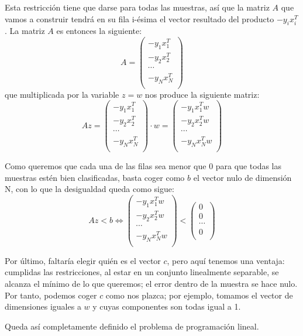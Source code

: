 \documentclass[a4paper, 11pt]{article}
\begin{document}
\begin{solucion}
        Esta restricción tiene que darse para todas las muestras, así que la matriz $A$ que vamos a construir tendrá en su fila i-ésima el vector resultado del producto $-y_i x_i^T$. La matriz $A$ es entonces la siguiente:
        \[
        A = \begin{pmatrix}
            -y_1 x_1^T \\
            -y_2 x_2^T \\
            \cdots \\
            -y_N x_N^T \\
        \end{pmatrix}
        \]
        que multiplicada por la variable $z = w$ nos produce la siguiente matriz:
        \[
        Az = \begin{pmatrix}
            -y_1 x_1^T \\
            -y_2 x_2^T \\
            \cdots \\
            -y_N x_N^T \\
        \end{pmatrix}\cdot w = \begin{pmatrix}
            -y_1 x_1^T w \\
            -y_2 x_2^T w \\
            \cdots \\
            -y_N x_N^T w \\
        \end{pmatrix}
        \]

        Como queremos que cada una de las filas sea menor que 0 para que todas las muestras estén bien clasificadas, basta coger como $b$ el vector nulo de dimensión N, con lo que la desigualdad queda como sigue:
        \[
        Az < b \iff \begin{pmatrix}
            -y_1 x_1^T w \\
            -y_2 x_2^T w \\
            \cdots \\
            -y_N x_N^T w \\
        \end{pmatrix} < \begin{pmatrix}
            0 \\
            0 \\
            \cdots \\
            0 \\
        \end{pmatrix}
        \]

        Por último, faltaría elegir quién es el vector $c$, pero aquí tenemos una ventaja: cumplidas las restricciones, al estar en un conjunto linealmente separable, se alcanza el mínimo de lo que queremos; el error dentro de la muestra se hace nulo. Por tanto, podemos coger $c$ como nos plazca; por ejemplo, tomamos el vector de dimensiones iguales a $w$ y cuyas componentes son todas igual a 1.

        Queda así completamente definido el problema de programación lineal.
      \end{solucion}
\end{document}
